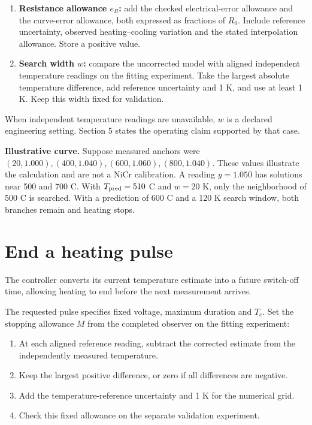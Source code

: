 \documentclass[11pt,letterpaper]{article}
\begin{document}
\begin{enumerate}[start=1]
\item \textbf{Resistance allowance \(e_R\):} add the checked electrical-error allowance and the curve-error allowance, both expressed as fractions of \(R_0\). Include reference uncertainty, observed heating--cooling variation and the stated interpolation allowance. Store a positive value.
\item \textbf{Search width \(w\):} compare the uncorrected model with aligned independent temperature readings on the fitting experiment. Take the largest absolute temperature difference, add reference uncertainty and 1 K, and use at least 1 K. Keep this width fixed for validation.
\end{enumerate}

When independent temperature readings are unavailable, \(w\) is a declared engineering setting. Section 5 states the operating claim supported by that case.

\textbf{Illustrative curve.} Suppose measured anchors were \((20,1.000),(400,1.040),(600,1.060),(800,1.040)\). These values illustrate the calculation and are not a NiCr calibration. A reading \(y=1.050\) has solutions near 500 and 700 \textdegree{}C. With \(T_{\rm pred}=510\) \textdegree{}C and \(w=20\) K, only the neighborhood of 500 \textdegree{}C is searched. With a prediction of 600 \textdegree{}C and a 120 K search window, both branches remain and heating stops.

\section{End a heating pulse}

The controller converts its current temperature estimate into a future switch-off time, allowing heating to end before the next measurement arrives.

The requested pulse specifies fixed voltage, maximum duration and \(T_c\). Set the stopping allowance \(M\) from the completed observer on the fitting experiment:

\begin{enumerate}[start=1]
\item At each aligned reference reading, subtract the corrected estimate from the independently measured temperature.
\item Keep the largest positive difference, or zero if all differences are negative.
\item Add the temperature-reference uncertainty and 1 K for the numerical grid.
\item Check this fixed allowance on the separate validation experiment.
\end{enumerate}
\end{document}
